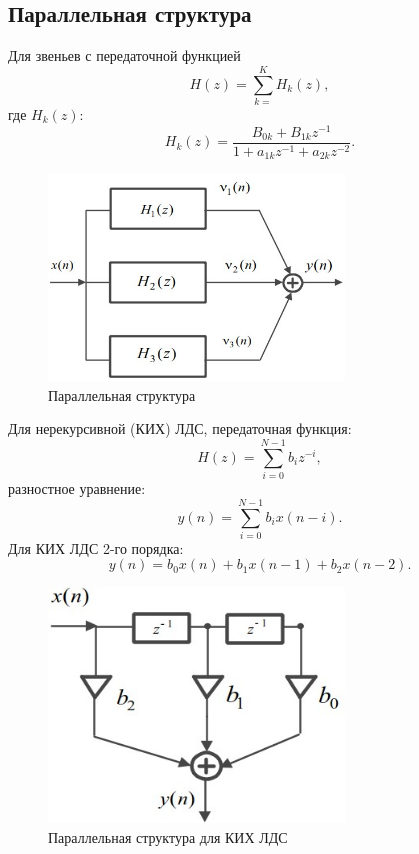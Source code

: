 \documentclass[a4paper, 14pt]{extarticle}
\begin{document}
\subsection{Параллельная структура}
Для звеньев с передаточной функцией
\begin{equation}
    H(z) = \sum^{K}_{k=} H_k(z),
\end{equation}
где $H_k(z)$:
\begin{equation}
    H_k(z) = \frac{B_{0k} + B_{1k}z^{-1}}{1+a_{1k}z^{-1}+a_{2k}z^{-2}}.
\end{equation}

\begin{figure}[h]
    \centering
    \includegraphics[width=0.7\textwidth]{img/S008.jpg}
    \caption{Параллельная структура}%
    \label{img:parr}
\end{figure}
\FloatBarrier{}

Для нерекурсивной (КИХ) ЛДС, передаточная функция:
\begin{equation}
    H(z) = \sum^{N-1}_{i=0} b_i z^{-i},
\end{equation}
разностное уравнение:
\begin{equation}
    y(n) = \sum^{N-1}_{i=0} b_i x(n-i).
\end{equation}
Для КИХ ЛДС 2-го порядка:
\begin{equation}
    y(n) = b_0 x(n) + b_1 x(n-1) + b_2 x(n-2).
\end{equation}

\begin{figure}[h]
    \centering
    \includegraphics[width=0.7\textwidth]{img/S009.jpg}
    \caption{Параллельная структура для КИХ ЛДС}%
    \label{img:cons:kix}
\end{figure}
\end{document}
